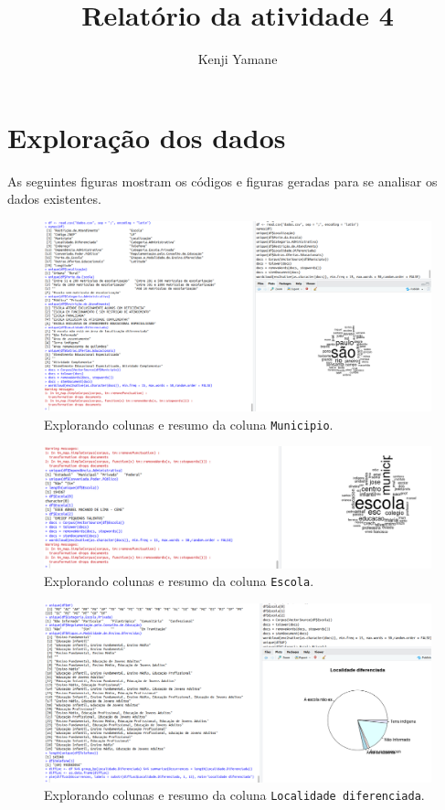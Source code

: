 \documentclass{article}[twocolumn]
\title{Relat\'orio da atividade 4}
\author{Kenji Yamane}
\begin{document}
	\maketitle
	\section{Explora\c{c}\~ao dos dados}
	As seguintes figuras mostram os c\'odigos e figuras geradas para se analisar os dados
	existentes.
	\begin{figure}[H]
		\centering
		\includegraphics[width=\textwidth]{figures/exploration1.png}
		\caption{Explorando colunas e resumo da coluna \texttt{Municipio}.}
	\end{figure}
	\begin{figure}[H]
		\centering
		\includegraphics[width=\textwidth]{figures/exploration2.png}
		\caption{Explorando colunas e resumo da coluna \texttt{Escola}.}
	\end{figure}
	\begin{figure}[H]
		\centering
		\includegraphics[width=\textwidth]{figures/exploration3.png}
		\caption{Explorando colunas e resumo da coluna \texttt{Localidade diferenciada}.}
	\end{figure}
\end{document}
